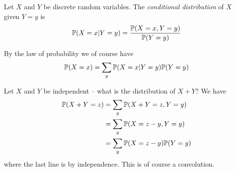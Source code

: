 \documentclass{../template/note}
\begin{document}
    \begin{definition}
        Let \(X\) and \(Y\) be discrete random variables. The \emph{conditional distribution} of \(X\) given \(Y = y\) is
        \begin{align*}
            \mathbb P(X = x | Y = y) = \frac{\mathbb P(X = x, Y = y)}{\mathbb P(Y = y)}
        \end{align*}
    \end{definition}
    By the law of probability we of course have
    \begin{align*}
        \mathbb P(X = x) = \sum_y \mathbb P(X = x| Y = y)\mathbb P(Y = y)
    \end{align*}
    

    Let \(X\) and \(Y\) be independent -- what is the distribution of \(X+Y\)? We have
    \begin{align*}
        \mathbb P(X + Y = z) &= \sum_y \mathbb P(X + Y = z, Y = y) \\
        &= \sum_y \mathbb P(X = z-y, Y = y) \\
        &= \sum_y \mathbb P(X = z-y)\mathbb P(Y = y)
    \end{align*}
    where the last line is by independence. This is of course a convolution.
\end{document}
